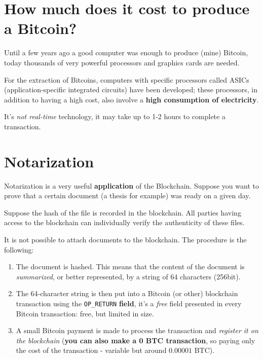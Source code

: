 
\section{How much does it cost to produce a Bitcoin?}

Until a few years ago a good computer was enough to produce (mine) Bitcoin, today thousands of very powerful processors and graphics cards are needed.

For the extraction of Bitcoins, computers with specific processors called ASICs (application-specific integrated circuits) have been developed; these processors, in addition to having a high cost, also involve a \textbf{high consumption of electricity}.

It's \textit{not real-time} technology, it may take up to 1-2 hours to complete a transaction.

\section{Notarization}

Notarization is a very useful \textbf{application} of the Blockchain. Suppose you want to prove that a certain document (a thesis for example) was ready on a given day.

Suppose the hash of the file is recorded in the blockchain. All parties having access to the blockchain can individually verify the authenticity of these files.

It is not possible to attach documents to the blockchain. The procedure is the following:
\begin{enumerate}
	\item The document is hashed. This means that the content of the document is \textit{summarized}, or better represented, by a string of 64 characters (256bit).
	\item The 64-character string is then put into a Bitcoin (or other) blockchain transaction using the \texttt{OP\_RETURN} \textbf{field}, it's a \textit{free} field presented in every Bitcoin transaction: free, but limited in size.
	\item A small Bitcoin payment is made to process the transaction and \textit{register it on the blockchain} (\textbf{you can also make a 0 BTC transaction}, so paying only the cost of the transaction - variable but around $0.00001$ BTC).
\end{enumerate}

